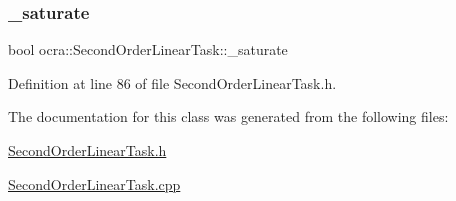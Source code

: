\subsubsection{\texorpdfstring{\+\_\+saturate}{\_saturate}}
{\footnotesize\ttfamily bool ocra\+::\+Second\+Order\+Linear\+Task\+::\+\_\+saturate\hspace{0.3cm}{\ttfamily [protected]}}



Definition at line 86 of file Second\+Order\+Linear\+Task.\+h.



The documentation for this class was generated from the following files\+:\begin{DoxyCompactItemize}
\item 
\hyperlink{SecondOrderLinearTask_8h}{Second\+Order\+Linear\+Task.\+h}\item 
\hyperlink{SecondOrderLinearTask_8cpp}{Second\+Order\+Linear\+Task.\+cpp}\end{DoxyCompactItemize}
